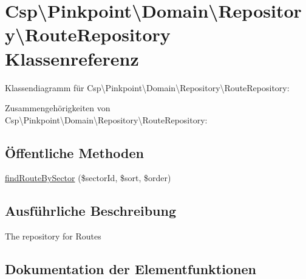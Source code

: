 \hypertarget{classCsp_1_1Pinkpoint_1_1Domain_1_1Repository_1_1RouteRepository}{}\section{Csp\textbackslash{}Pinkpoint\textbackslash{}Domain\textbackslash{}Repository\textbackslash{}Route\+Repository Klassenreferenz}
\label{classCsp_1_1Pinkpoint_1_1Domain_1_1Repository_1_1RouteRepository}


Klassendiagramm für Csp\textbackslash{}Pinkpoint\textbackslash{}Domain\textbackslash{}Repository\textbackslash{}Route\+Repository\+:


Zusammengehörigkeiten von Csp\textbackslash{}Pinkpoint\textbackslash{}Domain\textbackslash{}Repository\textbackslash{}Route\+Repository\+:
\subsection*{Öffentliche Methoden}
\begin{DoxyCompactItemize}
\item 
\hyperlink{classCsp_1_1Pinkpoint_1_1Domain_1_1Repository_1_1RouteRepository_a10e432ddc8cb7a827cffdfa2888c113c}{find\+Route\+By\+Sector} (\$sector\+Id, \$sort, \$order)
\end{DoxyCompactItemize}


\subsection{Ausführliche Beschreibung}
The repository for Routes 

\subsection{Dokumentation der Elementfunktionen}
\mbox{\label{classCsp_1_1Pinkpoint_1_1Domain_1_1Repository_1_1RouteRepository_a10e432ddc8cb7a827cffdfa2888c113c}} 

